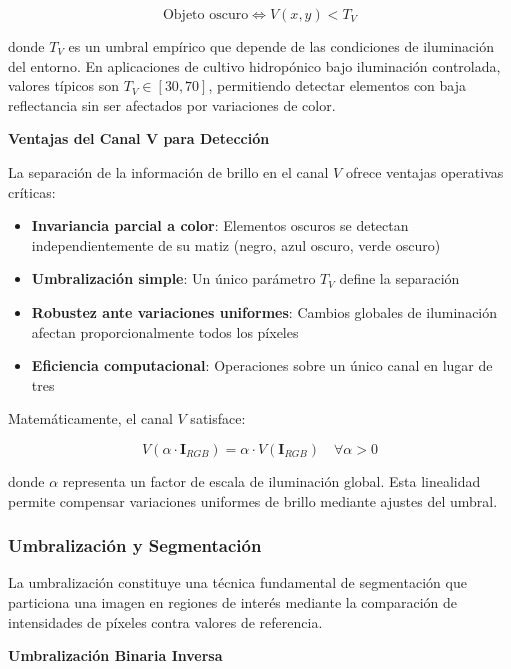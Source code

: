 \begin{equation}
\text{Objeto oscuro} \Leftrightarrow V(x,y) < T_V
\end{equation}

donde $T_V$ es un umbral empírico que depende de las condiciones de iluminación del entorno. En aplicaciones de cultivo hidropónico bajo iluminación controlada, valores típicos son $T_V \in [30, 70]$, permitiendo detectar elementos con baja reflectancia sin ser afectados por variaciones de color.

\textbf{Ventajas del Canal V para Detección}

La separación de la información de brillo en el canal $V$ ofrece ventajas operativas críticas:

\begin{itemize}
\item \textbf{Invariancia parcial a color}: Elementos oscuros se detectan independientemente de su matiz (negro, azul oscuro, verde oscuro)
\item \textbf{Umbralización simple}: Un único parámetro $T_V$ define la separación
\item \textbf{Robustez ante variaciones uniformes}: Cambios globales de iluminación afectan proporcionalmente todos los píxeles
\item \textbf{Eficiencia computacional}: Operaciones sobre un único canal en lugar de tres
\end{itemize}

Matemáticamente, el canal $V$ satisface:

\begin{equation}
V(\alpha \cdot \mathbf{I}_{RGB}) = \alpha \cdot V(\mathbf{I}_{RGB}) \quad \forall \alpha > 0
\end{equation}

donde $\alpha$ representa un factor de escala de iluminación global. Esta linealidad permite compensar variaciones uniformes de brillo mediante ajustes del umbral.

\subsubsection{Umbralización y Segmentación}

La umbralización constituye una técnica fundamental de segmentación que particiona una imagen en regiones de interés mediante la comparación de intensidades de píxeles contra valores de referencia.

\textbf{Umbralización Binaria Inversa}

